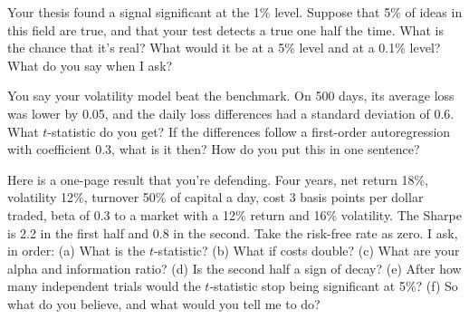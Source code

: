 \begin{question}\label{iq:iv2:your-strategy-and-your-project:18}
Your thesis found a signal significant at the 1\% level. Suppose that 5\% of ideas in this field are true, and that your test detects a true one half the time. What is the chance that it's real? What would it be at a 5\% level and at a 0.1\% level? What do you say when I ask?
\end{question}

\begin{question}\label{iq:iv2:your-strategy-and-your-project:19}
You say your volatility model beat the benchmark. On 500 days, its average loss was lower by 0.05, and the daily loss differences had a standard deviation of 0.6. What $t$-statistic do you get? If the differences follow a first-order autoregression with coefficient 0.3, what is it then? How do you put this in one sentence?
\end{question}

\begin{question}\label{iq:iv2:your-strategy-and-your-project:20}
Here is a one-page result that you're defending. Four years, net return 18\%, volatility 12\%, turnover 50\% of capital a day, cost 3 basis points per dollar traded, beta of 0.3 to a market with a 12\% return and 16\% volatility. The Sharpe is 2.2 in the first half and 0.8 in the second. Take the risk-free rate as zero. I ask, in order: (a) What is the $t$-statistic? (b) What if costs double? (c) What are your alpha and information ratio? (d) Is the second half a sign of decay? (e) After how many independent trials would the $t$-statistic stop being significant at 5\%? (f) So what do you believe, and what would you tell me to do?
\end{question}
